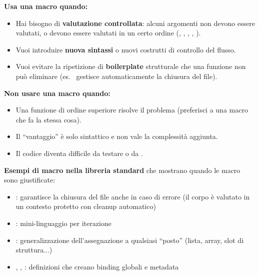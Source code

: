 \begin{tcolorbox}[
  enhanced,
  colback=black!2, colframe=black!20,
  arc=3pt, boxrule=0.4pt,
  left=12pt, right=12pt, top=9pt, bottom=9pt,
  before skip=8pt, after skip=10pt
]
\small\color{black!65}

\textbf{Usa una macro quando:}
\begin{itemize}
  \item Hai bisogno di \textbf{valutazione controllata}: alcuni argomenti
        non devono essere valutati, o devono essere valutati
        in un certo ordine (, , ,
        , ).
  \item Vuoi introduire \textbf{nuova sintassi} o nuovi costrutti
        di controllo del flusso.
  \item Vuoi evitare la ripetizione di \textbf{boilerplate} strutturale
        che una funzione non può eliminare (es.\ 
        gestisce automaticamente la chiusura del file).
\end{itemize}

\medskip
\textbf{Non usare una macro quando:}
\begin{itemize}
  \item Una funzione di ordine superiore risolve il problema
        (preferisci  a una macro che fa la stessa cosa).
  \item Il ``vantaggio'' è solo sintattico e non vale la complessità aggiunta.
  \item Il codice diventa difficile da testare o da .
\end{itemize}

\medskip
\textbf{Esempi di macro nella libreria standard} che mostrano
quando le macro sono giustificate:
\begin{itemize}
  \item {}: garantisce la chiusura del file
        anche in caso di errore (il corpo è valutato in un contesto
        protetto con cleanup automatico)
  \item {}: mini-linguaggio per iterazione
  \item {}: generalizzazione dell'assegnazione a qualsiasi
        ``posto'' (lista, array, slot di struttura...)
  \item {}, , : definizioni
        che creano binding globali e metadata
\end{itemize}
\end{tcolorbox}

